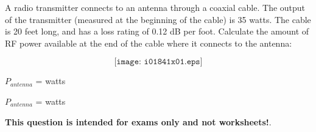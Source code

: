 

A radio transmitter connects to an antenna through a coaxial cable.  The output of the transmitter (measured at the beginning of the cable) is 35 watts.  The cable is 20 feet long, and has a loss rating of 0.12 dB per foot.  Calculate the amount of RF power available at the end of the cable where it connects to the antenna:

$$\texttt{[image: i01841x01.eps]}$$

$P_{antenna}$ = \underbar{\hskip 50pt} watts







$P_{antenna}$ =  watts







{\bf This question is intended for exams only and not worksheets!}.



